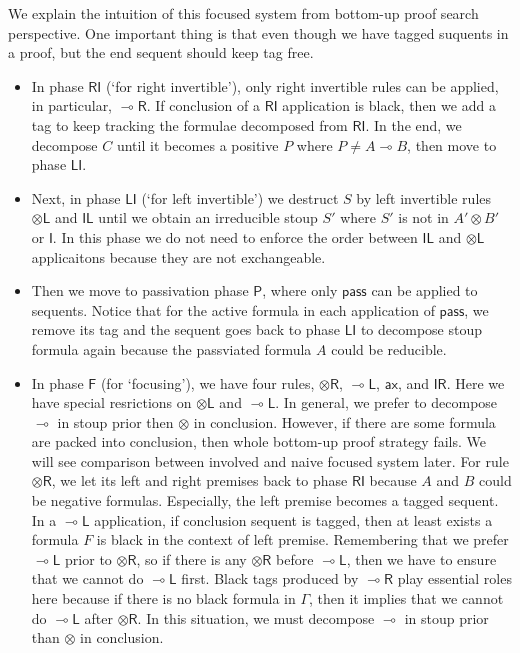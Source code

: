 \documentclass[submission,copyright,creativecommons]{eptcs}
\theoremstyle{definition}
\newcommand{\tl}{\otimes \mathsf{L}}
\newcommand{\tr}{\otimes \mathsf{R}}
\newcommand{\lright}{{\multimap}\mathsf{R}}
\newcommand{\lleft}{{\multimap}\mathsf{L}}
\newcommand{\pass}{\mathsf{pass}}
\newcommand{\unitl}{\mathsf{IL}}
\newcommand{\unitr}{\mathsf{IR}}
\newcommand{\ax}{\mathsf{ax}}
\newcommand{\ot}{\otimes}
\newcommand{\lolli}{\multimap}
\newcommand{\I}{\mathsf{I}}
\newcommand{\RI}{\mathsf{RI}}
\newcommand{\LI}{\mathsf{LI}}
\newcommand{\Pass}{\mathsf{P}}
\newcommand{\F}{\mathsf{F}}
\begin{document}
We explain the intuition of this focused system from bottom-up proof search perspective.
One important thing is that even though we have tagged suquents in a proof, but the end sequent should keep tag free.
\begin{itemize}
  \item In phase $\RI$ (`for right invertible'), only right invertible rules can be applied, in particular, $\lright$.
  If conclusion of a $\RI$ application is black, then we add a tag to keep tracking the formulae decomposed from $\RI$.
  In the end, we decompose $C$ until it becomes a positive $P$ where $P \neq A \lolli B$, then move to phase $\LI$.
  \item Next, in phase $\LI$ (`for left invertible') we destruct $S$ by left invertible rules $\tl$ and $\unitl$ until we obtain an irreducible stoup $S'$ where $S'$ is not in $A' \ot B'$ or $\I$.
  In this phase we do not need to enforce the order between $\unitl$ and $\tl$ applicaitons because they are not exchangeable.
  \item Then we move to passivation phase $\Pass$, where only $\pass$ can be applied to sequents.
  Notice that for the active formula in each application of $\pass$, we remove its tag and the sequent goes back to phase $\LI$ to decompose stoup formula again because the passviated formula $A$ could be reducible.
  \item In phase $\F$ (for `focusing'), we have four rules, $\tr$, $\lleft$, $\ax$, and $\unitr$.
  Here we have special resrictions on $\tl$ and $\lleft$.
  In general, we prefer to decompose $\lolli$ in stoup prior then $\ot$ in conclusion.
  However, if there are some formula are packed into conclusion, then whole bottom-up proof strategy fails.
  We will see comparison between involved and naive focused system later.
  For rule $\tr$, we let its left and right premises back to phase $\RI$ because $A$ and $B$ could be negative formulas.
  Especially, the left premise becomes a tagged sequent.
  In a $\lleft$ application, if conclusion sequent is tagged, then at least exists a formula $F$ is black in the context of left premise.
  Remembering that we prefer $\lleft$ prior to $\tr$, so if there is any $\tr$ before $\lleft$, then we have to ensure that we cannot do $\lleft$ first.
  Black tags produced by $\lright$ play essential roles here because if there is no black formula in $\Gamma$, then it implies that we cannot do $\lleft$ after $\tr$.
  In this situation, we must decompose $\lolli$ in stoup prior than $\ot$ in conclusion.
\end{itemize}
\end{document}

